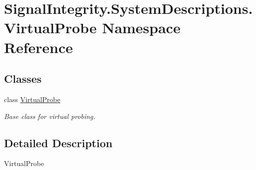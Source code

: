 \hypertarget{namespaceSignalIntegrity_1_1SystemDescriptions_1_1VirtualProbe}{}\section{Signal\+Integrity.\+System\+Descriptions.\+Virtual\+Probe Namespace Reference}
\label{namespaceSignalIntegrity_1_1SystemDescriptions_1_1VirtualProbe}
\subsection*{Classes}
\begin{DoxyCompactItemize}
\item 
class \hyperlink{classSignalIntegrity_1_1SystemDescriptions_1_1VirtualProbe_1_1VirtualProbe}{Virtual\+Probe}
\begin{DoxyCompactList}\small\item\em Base class for virtual probing. \end{DoxyCompactList}\end{DoxyCompactItemize}


\subsection{Detailed Description}
\begin{DoxyVerb}VirtualProbe\end{DoxyVerb}
 